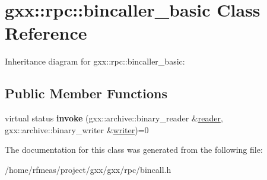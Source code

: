 \hypertarget{classgxx_1_1rpc_1_1bincaller__basic}{}\section{gxx\+:\+:rpc\+:\+:bincaller\+\_\+basic Class Reference}
\label{classgxx_1_1rpc_1_1bincaller__basic}


Inheritance diagram for gxx\+:\+:rpc\+:\+:bincaller\+\_\+basic\+:
\subsection*{Public Member Functions}
\begin{DoxyCompactItemize}
\item 
virtual status {\bfseries invoke} (gxx\+::archive\+::binary\+\_\+reader \&\hyperlink{classgxx_1_1reader}{reader}, gxx\+::archive\+::binary\+\_\+writer \&\hyperlink{classgxx_1_1writer}{writer})=0\hypertarget{classgxx_1_1rpc_1_1bincaller__basic_a62fb243bb96c754bb9b15b3d87c1b499}{}\label{classgxx_1_1rpc_1_1bincaller__basic_a62fb243bb96c754bb9b15b3d87c1b499}

\end{DoxyCompactItemize}


The documentation for this class was generated from the following file\+:\begin{DoxyCompactItemize}
\item 
/home/rfmeas/project/gxx/gxx/rpc/bincall.\+h\end{DoxyCompactItemize}
